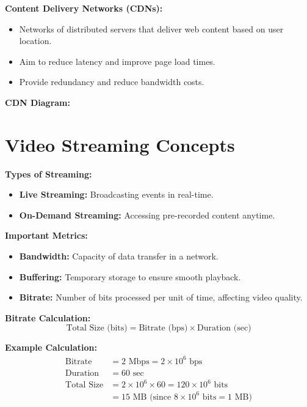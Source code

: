\documentclass[10pt]{article}
\begin{document}
\textbf{Content Delivery Networks (CDNs):}
\begin{itemize}
    \item Networks of distributed servers that deliver web content based on user location.
    \item Aim to reduce latency and improve page load times.
    \item Provide redundancy and reduce bandwidth costs.
\end{itemize}

\textbf{CDN Diagram:}

\section*{Video Streaming Concepts}

\textbf{Types of Streaming:}
\begin{itemize}
    \item \textbf{Live Streaming:} Broadcasting events in real-time.
    \item \textbf{On-Demand Streaming:} Accessing pre-recorded content anytime.
\end{itemize}

\textbf{Important Metrics:}
\begin{itemize}
    \item \textbf{Bandwidth:} Capacity of data transfer in a network.
    \item \textbf{Buffering:} Temporary storage to ensure smooth playback.
    \item \textbf{Bitrate:} Number of bits processed per unit of time, affecting video quality.
\end{itemize}

\textbf{Bitrate Calculation:}
\[
\text{Total Size (bits)} = \text{Bitrate (bps)} \times \text{Duration (sec)}
\]

\textbf{Example Calculation:}
\[
\begin{aligned}
\text{Bitrate} &= 2 \text{ Mbps} = 2 \times 10^6 \text{ bps} \\
\text{Duration} &= 60 \text{ sec} \\
\text{Total Size} &= 2 \times 10^6 \times 60 = 120 \times 10^6 \text{ bits} \\
&= 15 \text{ MB (since } 8 \times 10^6 \text{ bits} = 1 \text{ MB)}
\end{aligned}
\]
\end{document}
